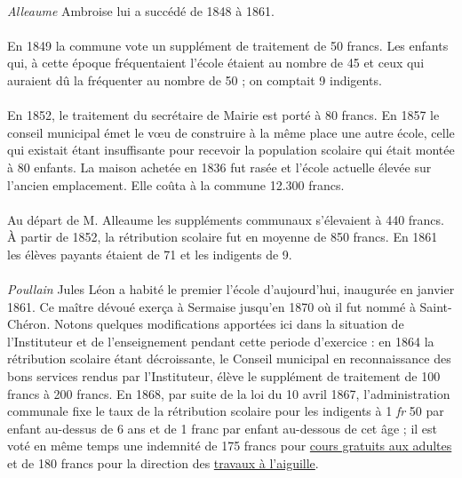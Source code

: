 \documentclass[../eBook.tex]{subfiles}
\begin{document}
      \paragraph{}\textit{Alleaume} Ambroise lui a succédé de 1848 à 1861.
      \paragraph{}En 1849 la commune vote un supplément de traitement de 50 francs. Les enfants qui, à cette époque fréquentaient l'école étaient au nombre de 45 et ceux qui auraient dû la fréquenter au nombre de 50 ; on comptait 9 indigents.
      \paragraph{}En 1852, le traitement du secrétaire de Mairie est porté à 80 francs. En 1857 le conseil municipal émet le v\oe u de construire à la même place une autre école, celle qui existait étant insuffisante pour recevoir la population scolaire qui était montée à 80 enfants. La maison achetée en 1836 fut rasée et l'école actuelle élevée sur l'ancien emplacement. Elle coûta à la commune 12.300 francs.
      \paragraph{}Au départ de M. Alleaume les suppléments communaux s'élevaient à 440 francs. À partir de 1852, la rétribution scolaire fut en moyenne de 850 francs. En 1861 les élèves payants étaient de 71 et les indigents de 9.
      \paragraph{}\textit{Poullain} Jules Léon a habité le premier l'école d'aujourd'hui, inaugurée en janvier 1861. Ce maître dévoué exerça à Sermaise jusqu'en 1870 où il fut nommé à Saint-Chéron. Notons quelques modifications apportées ici dans la situation de l'Instituteur et de l'enseignement pendant cette periode d'exercice : en 1864 la rétribution scolaire étant décroissante, le Conseil municipal en reconnaissance des bons services rendus par l'Instituteur, élève le supplément de traitement de 100 francs à 200 francs. En 1868, par suite de la loi du 10 avril 1867, l'administration communale fixe le taux de la rétribution scolaire pour les indigents à 1 \textit{fr} 50 par enfant au-dessus de 6 ans et de 1 franc par enfant au-dessous de cet âge ; il est voté en même temps une indemnité de 175 francs pour \underline{cours gratuits aux adultes} et de 180 francs pour la direction des \underline{travaux à l'aiguille}.
\end{document}
